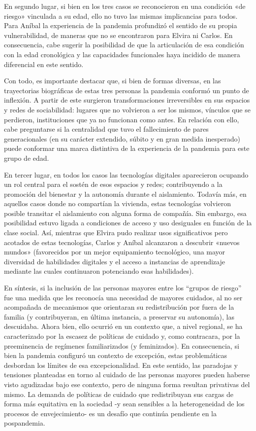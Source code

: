 En segundo lugar, si bien en los tres casos se reconocieron en una condición «de riesgo» vinculada a su edad, ello no tuvo las mismas implicancias para todos. Para Aníbal la experiencia de la pandemia profundizó el sentido de su propia vulnerabilidad, de maneras que no se encontraron para Elvira ni Carlos. En consecuencia, cabe sugerir la posibilidad de que la articulación de esa condición con la edad cronológica y las capacidades funcionales haya incidido de manera diferencial en este sentido.

Con todo, es importante destacar que, si bien de formas diversas, en las trayectorias biográficas de estas tres personas la pandemia conformó un punto de inflexión. A partir de este surgieron transformaciones irreversibles en sus espacios y redes de sociabilidad: lugares que no volvieron a ser los mismos, vínculos que se perdieron, instituciones que ya no funcionan como antes. En relación con ello, cabe preguntarse si la centralidad que tuvo el fallecimiento de pares generacionales (en su carácter extendido, súbito y en gran medida inesperado) puede conformar una marca distintiva de la experiencia de la pandemia para este grupo de edad.

En tercer lugar, en todos los casos las tecnologías digitales aparecieron ocupando un rol central para el sostén de esos espacios y redes; contribuyendo a la promoción del bienestar y la autonomía durante el aislamiento. Todavía más, en aquellos casos donde no compartían la vivienda, estas tecnologías volvieron posible transitar el aislamiento con alguna forma de compañía. Sin embargo, esa posibilidad estuvo ligada a condiciones de acceso y uso desiguales en función de la clase social. Así, mientras que Elvira pudo realizar usos significativos pero acotados de estas tecnologías, Carlos y Aníbal alcanzaron a descubrir «nuevos mundos» (favorecidos por un mejor equipamiento tecnológico, una mayor diversidad de habilidades digitales y el acceso a instancias de aprendizaje mediante las cuales continuaron potenciando esas habilidades).

En síntesis, si la inclusión de las personas mayores entre los ``grupos de riesgo'' fue una medida que les reconocía una necesidad de mayores cuidados, al no ser acompañada de mecanismos que orientaran su redistribución por fuera de la familia (y contribuyeran, en última instancia, a preservar su autonomía), las descuidaba. Ahora bien, ello ocurrió en un contexto que, a nivel regional, se ha caracterizado por la escasez de políticas de cuidado y, como contracara, por la preeminencia de regímenes familiarizados (y feminizados). En consecuencia, si bien la pandemia configuró un contexto de excepción, estas problemáticas desbordan los límites de esa excepcionalidad. En este sentido, las paradojas y tensiones planteadas en torno al cuidado de las personas mayores pueden haberse visto agudizadas bajo ese contexto, pero de ninguna forma resultan privativas del mismo. La demanda de políticas de cuidado que redistribuyan sus cargas de forma más equitativa en la sociedad -y sean sensibles a la heterogeneidad de los procesos de envejecimiento- es un desafío que continúa pendiente en la pospandemia.

